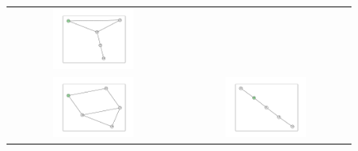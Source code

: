 \documentclass[12pt, a4paper]{extarticle}
\begin{document}
\begin{figure}
\begin{tabularx}{\textwidth}{cc}
\includegraphics[width=0.5\textwidth]{task11-graphlets/5_25-19-22-23-24.pdf} \\
\includegraphics[width=0.5\textwidth]{task11-graphlets/5_18-19-22-23-24.pdf} &
\includegraphics[width=0.5\textwidth]{task11-graphlets/5_14-13-21-23-24.pdf} \\
\end{tabularx}\end{figure}
\end{document}
